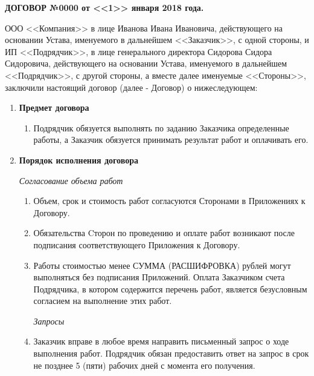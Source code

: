 \documentclass[14pt,a4paper]{article}
\begin{document}
\begin{center}
\textbf{ДОГОВОР №0000 от <<1>> января 2018 года.}
\end{center}

ООО <<Компания>> в лице Иванова Ивана Ивановича, действующего на основании Устава, именуемого в дальнейшем <<Заказчик>>, с одной стороны, и ИП <<Подрядчик>>, в лице генерального директора Сидорова Сидора Сидоровича, действующего на основании Устава, именуемого в дальнейшем <<Подрядчик>>, с другой стороны, а вместе далее именуемые <<Стороны>>, заключили настоящий договор (далее - Договор) о нижеследующем:

\begin{enumerate}
	\item
	\begin{center}
	\textbf{Предмет договора}
	\end{center}
	\begin{enumerate}
		\item Подрядчик обязуется выполнять по заданию Заказчика определенные работы, а Заказчик обязуется принимать результат работ и оплачивать его.
	\end{enumerate}

	\item
	\begin{center}
	\textbf{Порядок исполнения договора}
	\end{center}
	\noindent
	\textit{Согласование объема работ}
	\begin{enumerate}

		\item Объем, срок и стоимость работ согласуются Сторонами в Приложениях к Договору.

		\item Обязательства Cторон по проведению и оплате работ возникают после подписания соответствующего Приложения к Договору.

		\item Работы стоимостью менее СУММА (РАСШИФРОВКА) рублей могут выполняться без подписания Приложений. Оплата Заказчиком счета Подрядчика, в котором содержится перечень работ, является безусловным согласием на выполнение этих работ.

		\textit{Запросы}

		\item Заказчик вправе в любое время направить письменный запрос о ходе выполнения работ. Подрядчик обязан предоставить ответ на запрос в срок не позднее 5 (пяти) рабочих дней с момента его получения.


\end{enumerate}
\end{enumerate}
\end{document}
